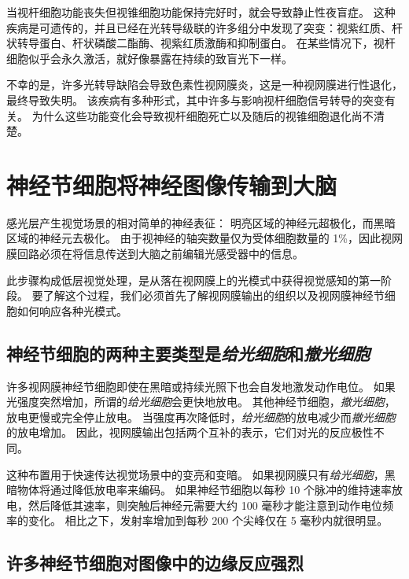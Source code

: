 当视杆细胞功能丧失但视锥细胞功能保持完好时，就会导致静止性夜盲症。
这种疾病是可遗传的，并且已经在光转导级联的许多组分中发现了突变：视紫红质、杆状转导蛋白、杆状磷酸二酯酶、视紫红质激酶和抑制蛋白。
在某些情况下，视杆细胞似乎会永久激活，就好像暴露在持续的致盲光下一样。


不幸的是，许多光转导缺陷会导致色素性视网膜炎，这是一种视网膜进行性退化，最终导致失明。
该疾病有多种形式，其中许多与影响视杆细胞信号转导的突变有关。
为什么这些功能变化会导致视杆细胞死亡以及随后的视锥细胞退化尚不清楚。



\section{神经节细胞将神经图像传输到大脑}

感光层产生视觉场景的相对简单的神经表征：
明亮区域的神经元超极化，而黑暗区域的神经元去极化。
由于视神经的轴突数量仅为受体细胞数量的 1\%，因此视网膜回路必须在将信息传送到大脑之前编辑光感受器中的信息。


此步骤构成低层视觉处理，是从落在视网膜上的光模式中获得视觉感知的第一阶段。
要了解这个过程，我们必须首先了解视网膜输出的组织以及视网膜神经节细胞如何响应各种光模式。



\subsection{神经节细胞的两种主要类型是\textit{给光细胞}和\textit{撤光细胞}}

许多视网膜神经节细胞即使在黑暗或持续光照下也会自发地激发动作电位。
如果光强度突然增加，所谓的\textit{给光细胞}会更快地放电。
其他神经节细胞，\textit{撤光细胞}，放电更慢或完全停止放电。
当强度再次降低时，\textit{给光细胞}的放电减少而\textit{撤光细胞}的放电增加。
因此，视网膜输出包括两个互补的表示，它们对光的反应极性不同。


这种布置用于快速传达视觉场景中的变亮和变暗。
如果视网膜只有\textit{给光细胞}，黑暗物体将通过降低放电率来编码。
如果神经节细胞以每秒 10 个脉冲的维持速率放电，然后降低其速率，则突触后神经元需要大约 100 毫秒才能注意到动作电位频率的变化。
相比之下，发射率增加到每秒 200 个尖峰仅在 5 毫秒内就很明显。



\subsection{许多神经节细胞对图像中的边缘反应强烈}


